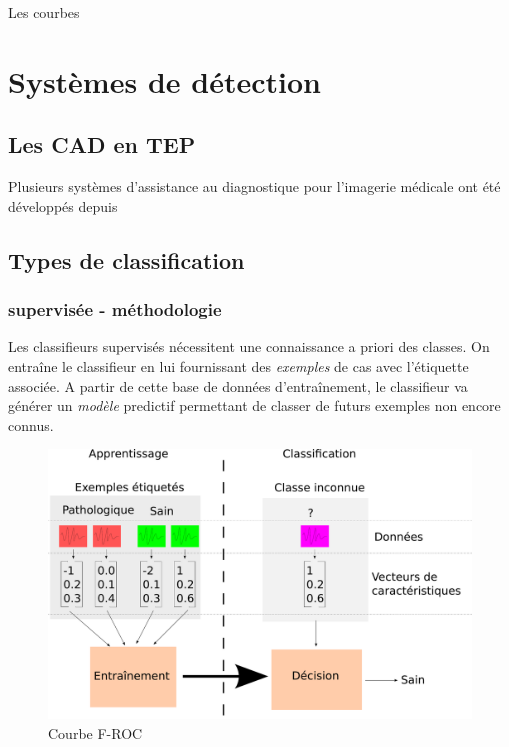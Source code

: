 Les courbes \FROC

\chapter{Systèmes de détection}

	\section{Les CAD en TEP}

Plusieurs systèmes d'assistance au diagnostique pour l'imagerie médicale ont été développés depuis  

	\section{Types de classification}
		\subsection{supervisée - méthodologie}

Les classifieurs supervisés nécessitent une connaissance a priori des classes. On entraîne le classifieur en lui fournissant des \emph{exemples} de cas avec l'étiquette associée. A partir de cette base de données d'entraînement, le classifieur va générer un \emph{modèle} predictif permettant de classer de futurs exemples non encore connus.

\begin{figure}[h]
	
	\label{fig:courbeFROC}
	\begin{center}
	\includegraphics[width=15cm]{images/fonctionnementClassif}
	\end{center}
	\caption{Courbe F-ROC}
\end{figure}

